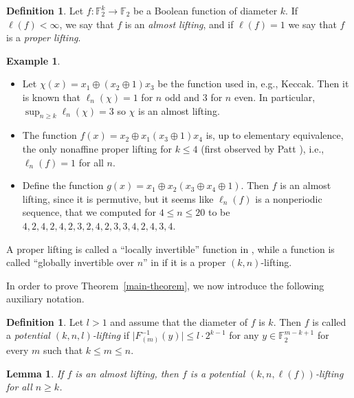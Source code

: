 \documentclass[11pt,english,a4paper]{amsart}
\theoremstyle{plain}
\newtheorem{lemma}[theorem]{Lemma}
\theoremstyle{definition}
\newtheorem{definition}[theorem]{Definition}
\newtheorem{example}[theorem]{Example}
\newtheorem{remark}[theorem]{Remark}
\theoremstyle{remark}
\newcommand{\F}{\mathbb{F}}
\begin{document}
	\begin{definition}
		Let $f\colon\F_2^k\to\F_2$ be a Boolean function of diameter $k$.
		If $\ell(f)<\infty$, we say that $f$ is an \emph{almost lifting}, and if $\ell(f)=1$ we say that $f$ is a \emph{proper lifting}.
  \end{definition}

\begin{example}
\begin{itemize}
    \item[(i)]
    Let $\chi(x)=x_1\oplus (x_2\oplus 1)x_3$ be the function used in, e.g., Keccak. Then it is known that $\ell_n(\chi)=1$ for $n$ odd and $3$ for $n$ even. In particular, $\sup_{n\geq k}\ell_n(\chi)=3$ so $\chi$ is an almost lifting.
    \item[(ii)]
    The function $f(x)=x_2\oplus x_1(x_3\oplus1)x_4$ is, up to elementary equivalence, the only nonaffine proper lifting for $k\leq 4$ (first observed by Patt \cite{patt}), i.e., $\ell_n(f)=1$ for all $n$.
    \item[(iii)]
    Define the function $g(x)=x_1\oplus x_2(x_3\oplus x_4\oplus 1)$. Then $f$ is an almost lifting, since it is permutive, but it seems like $\ell_n(f)$ is a nonperiodic sequence, that we computed for $4\leq n\leq 20$ to be $4,2,4,2,4,2,3,2,4,2,3,3,4,2,4,3,4$.
\end{itemize}

\end{example}

    A proper lifting is called a ``locally invertible'' function in \cite{JDA-thesis}, while a function is called ``globally invertible over $n$'' in \cite{JDA-thesis} if it is a proper $(k,n)$-lifting.

\medskip

In order to prove Theorem~\ref{main-theorem}, we now introduce the following auxiliary notation.


  \begin{definition}
		Let $l>1$ and assume that the diameter of $f$ is $k$.
		Then $f$ is called a \emph{potential $(k, n, l)$-lifting} if $\lvert F_{(m)}^{-1}(y) \rvert \leq l \cdot 2^{k-1}$ for any $y \in \F_2^{m-k+1}$ for every $m$ such that $k \leq m \leq n$.
	\end{definition}
	
	\begin{lemma}\label{almost-then-potential-l}
		If $f$ is an almost lifting, then $f$ is a potential $(k, n, \ell(f))$-lifting for all $n \geq k$.
	\end{lemma}
	
\end{document}
